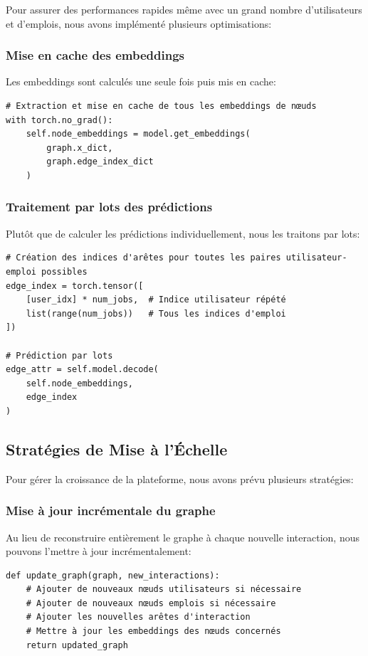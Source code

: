 \documentclass[12pt,a4paper]{article}
\begin{document}
Pour assurer des performances rapides même avec un grand nombre d'utilisateurs et d'emplois, nous avons implémenté plusieurs optimisations:

\subsubsection{Mise en cache des embeddings}
Les embeddings sont calculés une seule fois puis mis en cache:

\begin{lstlisting}[caption=Mise en cache des embeddings]
# Extraction et mise en cache de tous les embeddings de nœuds
with torch.no_grad():
    self.node_embeddings = model.get_embeddings(
        graph.x_dict,
        graph.edge_index_dict
    )
\end{lstlisting}

\subsubsection{Traitement par lots des prédictions}
Plutôt que de calculer les prédictions individuellement, nous les traitons par lots:

\begin{lstlisting}[caption=Prédiction par lots]
# Création des indices d'arêtes pour toutes les paires utilisateur-emploi possibles
edge_index = torch.tensor([
    [user_idx] * num_jobs,  # Indice utilisateur répété
    list(range(num_jobs))   # Tous les indices d'emploi
])

# Prédiction par lots
edge_attr = self.model.decode(
    self.node_embeddings,
    edge_index
)
\end{lstlisting}

\subsection{Stratégies de Mise à l'Échelle}

Pour gérer la croissance de la plateforme, nous avons prévu plusieurs stratégies:

\subsubsection{Mise à jour incrémentale du graphe}
Au lieu de reconstruire entièrement le graphe à chaque nouvelle interaction, nous pouvons l'mettre à jour incrémentalement:

\begin{lstlisting}[caption=Mise à jour incrémentale conceptuelle]
def update_graph(graph, new_interactions):
    # Ajouter de nouveaux nœuds utilisateurs si nécessaire
    # Ajouter de nouveaux nœuds emplois si nécessaire
    # Ajouter les nouvelles arêtes d'interaction
    # Mettre à jour les embeddings des nœuds concernés
    return updated_graph
\end{lstlisting}
\end{document}
